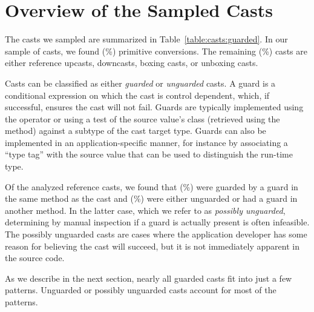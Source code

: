 \section{Overview of the Sampled Casts}
\label{sec:casts:overview}

The casts we sampled are summarized in Table~\ref{table:casts:guarded}.
In our sample of \nSize{} casts,
we found \nPrimitivePattern{} (\pPrimitivePattern\%) primitive conversions.
The remaining \nReference{} (\pReference\%) casts are either reference upcasts,
downcasts, boxing casts, or unboxing casts.



Casts can be classified as either \emph{guarded} or \emph{unguarded} casts.
A guard is a conditional expression on which the cast is control dependent,
which, if successful, ensures the cast will not fail.
Guards are typically implemented using the  operator or using
a test of the source value's class (retrieved using the
 method) against a subtype of the cast target type.
Guards can also be implemented in an application-specific manner, for instance
by associating a ``type tag'' with the source value that can be used to
distinguish the run-time type.

Of the \nReference{} analyzed reference casts,
we found that \nGuarded{} (\pGuarded\%) were guarded by a
guard in the same method as the cast and \nUnguarded{} (\pUnguarded\%)
were either unguarded or had a guard in another method.
In the latter case, which we refer to as \emph{possibly unguarded},
determining by manual inspection if a guard is actually
present is often infeasible. The possibly unguarded casts are cases where the application developer
has some reason for believing the cast will succeed, but it is not immediately
apparent in the source code.

As we describe in the next section, nearly all guarded casts fit into just a
few patterns. Unguarded or possibly unguarded casts account for most of the
patterns.
